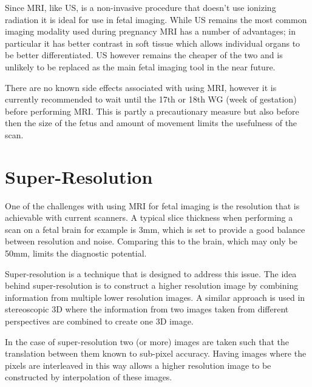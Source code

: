 Since MRI, like US, is a non-invasive procedure that doesn’t use ionizing radiation it is ideal for use in fetal imaging. While US remains the most common imaging modality used during pregnancy MRI has a number of advantages; in particular it has better contrast in soft tissue which allows individual organs to be better differentiated. US however remains the cheaper of the two and is unlikely to be replaced as the main fetal imaging tool in the near future.

There are no known side effects associated with using MRI, however it is currently recommended to wait until the 17th or 18th WG (week of gestation) before performing MRI. This is partly a precautionary measure but also before then the size of the fetus and amount of movement limits the usefulness of the scan.

\newpage
\section{Super-Resolution}\label{background:superresolution}

One of the challenges with using MRI for fetal imaging is the resolution that is achievable with current scanners. A typical slice thickness when performing a scan on a fetal brain for example is 3mm, which is set to provide a good balance between resolution and noise. Comparing this to the brain, which may only be 50mm, limits the diagnostic potential.

Super-resolution is a technique that is designed to address this issue. The idea behind super-resolution is to construct a higher resolution image by combining information from multiple lower resolution images. A similar approach is used in stereoscopic 3D where the information from two images taken from different perspectives are combined to create one 3D image.

In the case of super-resolution two (or more) images are taken such that the translation between them known to sub-pixel accuracy. Having images where the pixels are interleaved in this way allows a higher resolution image to be constructed by interpolation of these images.

